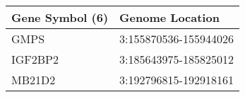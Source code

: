 \begin{tabular}{ll}
\toprule
Gene Symbol (6) &       Genome Location \\
\midrule
           GMPS & 3:155870536-155944026 \\
        IGF2BP2 & 3:185643975-185825012 \\
         MB21D2 & 3:192796815-192918161 \\
\bottomrule
\end{tabular}
